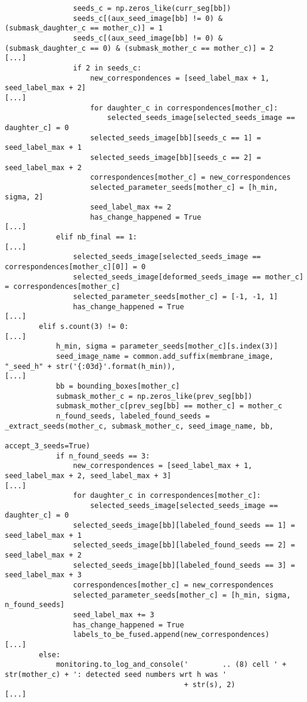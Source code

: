 \documentclass{article}
\begin{document}
\begin{verbatim}
                seeds_c = np.zeros_like(curr_seg[bb])
                seeds_c[(aux_seed_image[bb] != 0) & (submask_daughter_c == mother_c)] = 1
                seeds_c[(aux_seed_image[bb] != 0) & (submask_daughter_c == 0) & (submask_mother_c == mother_c)] = 2
[...]
                if 2 in seeds_c:
                    new_correspondences = [seed_label_max + 1, seed_label_max + 2]
[...]
                    for daughter_c in correspondences[mother_c]:
                        selected_seeds_image[selected_seeds_image == daughter_c] = 0
                    selected_seeds_image[bb][seeds_c == 1] = seed_label_max + 1
                    selected_seeds_image[bb][seeds_c == 2] = seed_label_max + 2
                    correspondences[mother_c] = new_correspondences
                    selected_parameter_seeds[mother_c] = [h_min, sigma, 2]
                    seed_label_max += 2
                    has_change_happened = True
[...]
            elif nb_final == 1:
[...]
                selected_seeds_image[selected_seeds_image == correspondences[mother_c][0]] = 0
                selected_seeds_image[deformed_seeds_image == mother_c] = correspondences[mother_c]
                selected_parameter_seeds[mother_c] = [-1, -1, 1]
                has_change_happened = True
[...]
        elif s.count(3) != 0:
[...]
            h_min, sigma = parameter_seeds[mother_c][s.index(3)]
            seed_image_name = common.add_suffix(membrane_image, "_seed_h" + str('{:03d}'.format(h_min)),
[...]
            bb = bounding_boxes[mother_c]
            submask_mother_c = np.zeros_like(prev_seg[bb])
            submask_mother_c[prev_seg[bb] == mother_c] = mother_c
            n_found_seeds, labeled_found_seeds = _extract_seeds(mother_c, submask_mother_c, seed_image_name, bb,
                                                                accept_3_seeds=True)
            if n_found_seeds == 3:
                new_correspondences = [seed_label_max + 1, seed_label_max + 2, seed_label_max + 3]
[...]
                for daughter_c in correspondences[mother_c]:
                    selected_seeds_image[selected_seeds_image == daughter_c] = 0
                selected_seeds_image[bb][labeled_found_seeds == 1] = seed_label_max + 1
                selected_seeds_image[bb][labeled_found_seeds == 2] = seed_label_max + 2
                selected_seeds_image[bb][labeled_found_seeds == 3] = seed_label_max + 3
                correspondences[mother_c] = new_correspondences
                selected_parameter_seeds[mother_c] = [h_min, sigma, n_found_seeds]
                seed_label_max += 3
                has_change_happened = True
                labels_to_be_fused.append(new_correspondences)
[...]
        else:
            monitoring.to_log_and_console('        .. (8) cell ' + str(mother_c) + ': detected seed numbers wrt h was '
                                          + str(s), 2)
[...]


\end{verbatim}
\end{document}
